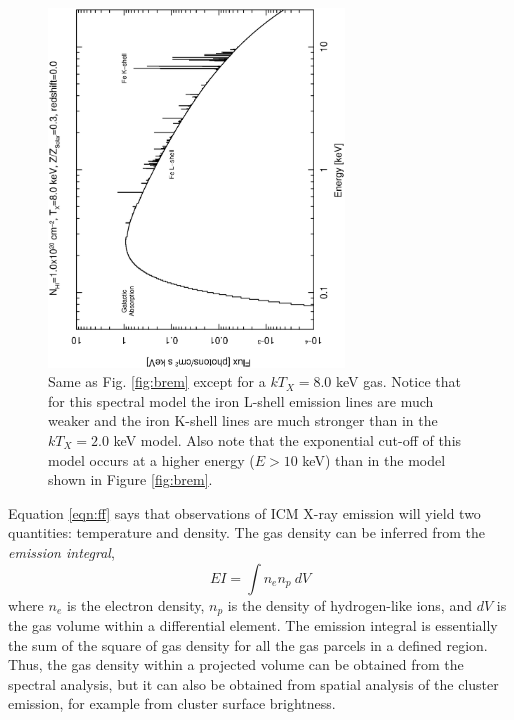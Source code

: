 \begin{figure}[htp]
\begin{center}
\begin{minipage}[htp]{0.8\linewidth}
      \includegraphics*[width=0.7\textwidth,trim=10mm 0mm 0mm 10mm,angle=270,clip]{brem2}
      \caption[Synthetic spectral model of $kT_X=8.0$ keV gas.]{Same as
        Fig. \ref{fig:brem} except for a $kT_X=8.0$ keV gas. Notice that for
        this spectral model the iron L-shell emission lines are much weaker
        and the iron K-shell lines are much stronger than in the $kT_X=2.0$
        keV model. Also note that the exponential cut-off of this model
        occurs at a higher energy ($E > 10$ keV) than in the model shown in
        Figure \ref{fig:brem}.}
      \label{fig:brem2}
    \end{minipage}
  \end{center}
\end{figure}

Equation \ref{eqn:ff} says that observations of ICM X-ray emission
will yield two quantities: temperature and density. The gas density
can be inferred from the {\it{emission integral}},
\begin{equation}
\label{eqn:ei}
EI = \int n_e n_p~dV
\end{equation}
where $n_e$ is the electron density, $n_p$ is the density of
hydrogen-like ions, and $dV$ is the gas volume within a differential
element. The emission integral is essentially the sum of the square of
gas density for all the gas parcels in a defined region. Thus, the gas
density within a projected volume can be obtained from the spectral
analysis, but it can also be obtained from spatial analysis of the
cluster emission, for example from cluster surface brightness.

